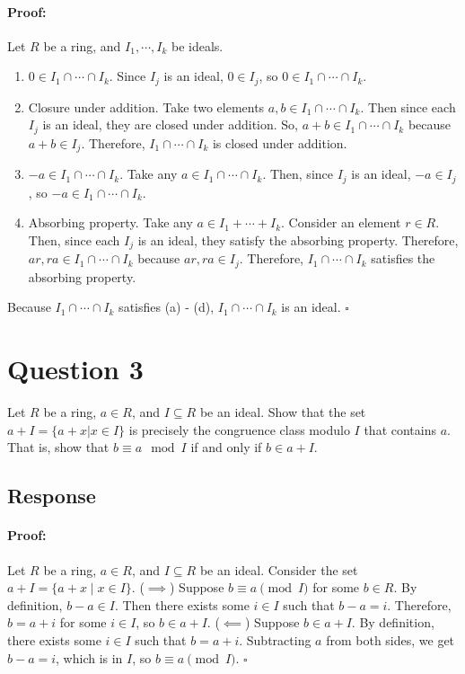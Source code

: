 \documentclass [12pt] {article}
\newenvironment{proof}{\paragraph{Proof:}}{\hfill$\square$}
\begin{document}
\begin{enumerate}
        \vspace{-1.5em}
        \begin{proof}
            Let $R$ be a ring, and $I_1, \cdots, I_k$ be ideals.
            \begin{enumerate}
                \item $0 \in I_1 \cap \cdots \cap I_k$. Since $I_j$ is an ideal, $0 \in I_j$, so 
                    $0 \in I_1 \cap \cdots \cap I_k$.
                \item Closure under addition. Take two elements $a, b \in I_1 \cap \cdots \cap I_k$. 
                    Then since each $I_j$ is an ideal, they are closed under addition. So, 
                    $a + b \in I_1 \cap \cdots \cap I_k$ because $a + b \in I_j$. Therefore, 
                    $I_1 \cap \cdots \cap I_k$ is closed under addition.
                \item $-a \in I_1 \cap \cdots \cap I_k$. Take any $a \in I_1 \cap \cdots \cap I_k$. 
                    Then, since $I_j$ is an ideal, $-a \in I_j$, so $-a \in I_1 \cap \cdots \cap I_k$.
                \item Absorbing property. Take any $a \in I_1 + \cdots + I_k$. Consider an element 
                    $r \in R$. Then, since each $I_j$ is an ideal, they satisfy the absorbing
                    property. Therefore, $ar, ra \in I_1 \cap \cdots \cap I_k$ because 
                    $ar, ra \in I_j$. Therefore, $I_1 \cap \cdots \cap I_k$ satisfies the absorbing
                    property.
            \end{enumerate}
            Because $I_1 \cap \cdots \cap I_k$ satisfies (a) - (d), $I_1 \cap \cdots \cap I_k$ is an ideal.
        \end{proof}
\end{enumerate}
\newpage

\section*{Question 3}
Let $R$ be a ring, $a\in R$, and $I\subseteq R$ be an ideal. Show that the set $a+I=\{a+x|x\in I\}$ is precisely the congruence class modulo $I$ that contains $a$. That is, show that $b\equiv a\mod I$ if and only if $b\in a+I$. 
\subsection*{Response}
\begin{proof}
    Let $R$ be a ring, $a \in R$, and $I \subseteq R$ be an ideal. Consider the set 
    $a + I = \{ a + x \mid x \in I \}$.
    \newline
    ($\implies$) Suppose $b \equiv a \pmod{I}$ for some $b \in R$. By definition, $b - a \in I$. 
    Then there exists some $i \in I$ such that $b - a = i$. Therefore, $b = a + i$ for some 
    $i \in I$, so $b \in a + I$.
    \newline
    ($\impliedby$) Suppose $b \in a + I$. By definition, there exists some $i \in I$ such that
    $b = a + i$. Subtracting $a$ from both sides, we get $b - a = i$, which is in $I$, so 
    $b \equiv a \pmod{I}$.
\end{proof}
\newpage
\end{document}
